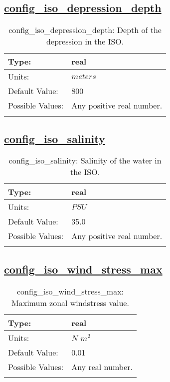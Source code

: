 \subsection[config\_iso\_depression\_depth]{\hyperref[sec:nm_tab_iso]{config\_iso\_depression\_depth}}
\label{subsec:nm_sec_config_iso_depression_depth}
\begin{center}
\begin{longtable}{| p{2.0in} || p{4.0in} |}
    \hline
    Type: & real \\
    \hline
    Units: & $meters$ \\
    \hline
    Default Value: & 800 \\
    \hline
    Possible Values: & Any positive real number. \\
    \hline
    \caption{config\_iso\_depression\_depth: Depth of the depression in the ISO.}
\end{longtable}
\end{center}
\subsection[config\_iso\_salinity]{\hyperref[sec:nm_tab_iso]{config\_iso\_salinity}}
\label{subsec:nm_sec_config_iso_salinity}
\begin{center}
\begin{longtable}{| p{2.0in} || p{4.0in} |}
    \hline
    Type: & real \\
    \hline
    Units: & $PSU$ \\
    \hline
    Default Value: & 35.0 \\
    \hline
    Possible Values: & Any positive real number. \\
    \hline
    \caption{config\_iso\_salinity: Salinity of the water in the ISO.}
\end{longtable}
\end{center}
\subsection[config\_iso\_wind\_stress\_max]{\hyperref[sec:nm_tab_iso]{config\_iso\_wind\_stress\_max}}
\label{subsec:nm_sec_config_iso_wind_stress_max}
\begin{center}
\begin{longtable}{| p{2.0in} || p{4.0in} |}
    \hline
    Type: & real \\
    \hline
    Units: & $N$ $m^{2}$ \\
    \hline
    Default Value: & 0.01 \\
    \hline
    Possible Values: & Any real number. \\
    \hline
    \caption{config\_iso\_wind\_stress\_max: Maximum zonal windstress value.}
\end{longtable}
\end{center}
